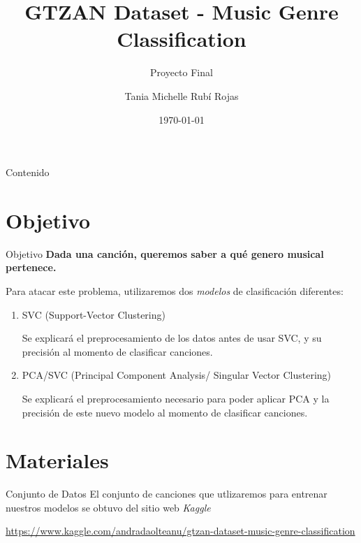 \documentclass[11pt]{beamer}
\author{Tania Michelle Rubí Rojas}
\title[Music Genre Classification]{GTZAN Dataset - Music Genre Classification}
\date{\today}
\subtitle{Proyecto Final}
\institute[UNAM]{Facultad de Ciencias, UNAM}
\begin{document}
\begin{frame}
    \maketitle
\end{frame}

\begin{frame}{Contenido}
    \tableofcontents
\end{frame}

\section{Objetivo}
\begin{frame}{Objetivo}
    \justifying
    \textbf{Dada una canción, queremos saber a qué genero musical pertenece.}
    
    Para atacar este problema, utilizaremos dos \textit{modelos} de 
    clasificación diferentes:
    \begin{enumerate}
        \item SVC (Support-Vector Clustering)
        
        Se explicará el preprocesamiento de los datos antes de usar SVC, y su 
        precisión al momento de clasificar canciones.
        
        \item PCA/SVC (Principal Component Analysis/ Singular Vector Clustering)
        
        Se explicará el preprocesamiento necesario para poder aplicar PCA y la
        precisión de este nuevo modelo al momento de clasificar canciones.
    \end{enumerate}
\end{frame}
	
\section{Materiales}
\begin{frame}{Conjunto de Datos}
    \justifying
    El conjunto de canciones que utlizaremos para entrenar nuestros modelos
    se obtuvo del sitio web \textit{Kaggle}
    \begin{center}
        \url{https://www.kaggle.com/andradaolteanu/gtzan-dataset-music-genre-classification}
    \end{center}
\end{frame}
\end{document}
